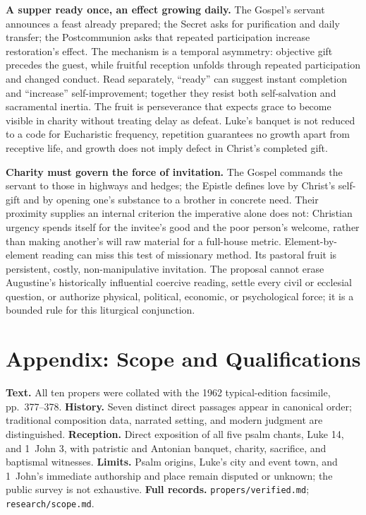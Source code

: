 \begin{deepstudy}
\noindent\textbf{A supper ready once, an effect growing daily.\enspace{}}
The Gospel's servant announces a feast already prepared; the Secret asks for purification and daily transfer; the Postcommunion asks that repeated participation increase restoration's effect. The mechanism is a temporal asymmetry: objective gift precedes the guest, while fruitful reception unfolds through repeated participation and changed conduct. Read separately, ``ready'' can suggest instant completion and ``increase'' self-improvement; together they resist both self-salvation and sacramental inertia. The fruit is perseverance that expects grace to become visible in charity without treating delay as defeat. Luke's banquet is not reduced to a code for Eucharistic frequency, repetition guarantees no growth apart from receptive life, and growth does not imply defect in Christ's completed gift.

\noindent\textbf{Charity must govern the force of invitation.\enspace{}}
The Gospel commands the servant to  those in highways and hedges; the Epistle defines love by Christ's self-gift and by opening one's substance to a brother in concrete need. Their proximity supplies an internal criterion the imperative alone does not: Christian urgency spends itself for the invitee's good and the poor person's welcome, rather than making another's will raw material for a full-house metric. Element-by-element reading can miss this test of missionary method. Its pastoral fruit is persistent, costly, non-manipulative invitation. The proposal cannot erase Augustine's historically influential coercive reading, settle every civil or ecclesial question, or authorize physical, political, economic, or psychological force; it is a bounded rule for this liturgical conjunction.


\section*{Appendix: Scope and Qualifications}

\begin{studyframe}
\textbf{Text.} All ten propers were collated with the 1962 typical-edition facsimile, pp.~377--378. \textbf{History.} Seven distinct direct passages appear in canonical order; traditional composition data, narrated setting, and modern judgment are distinguished. \textbf{Reception.} Direct exposition of all five psalm chants, Luke 14, and 1~John 3, with patristic and Antonian banquet, charity, sacrifice, and baptismal witnesses. \textbf{Limits.} Psalm origins, Luke's city and event town, and 1~John's immediate authorship and place remain disputed or unknown; the public survey is not exhaustive. \textbf{Full records.} \nolinkurl{propers/verified.md}; \nolinkurl{research/scope.md}.
\end{studyframe}


\end{deepstudy}
